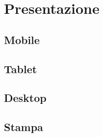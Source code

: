 \section{Presentazione}
\label{presentazione}

\subsection{Mobile}
\label{presentazione-mobile}


\subsection{Tablet}
\label{presentazione-tablet}



\subsection{Desktop}
\label{presentazione-desktop}



\subsection{Stampa}
\label{presentazione-stampa}

